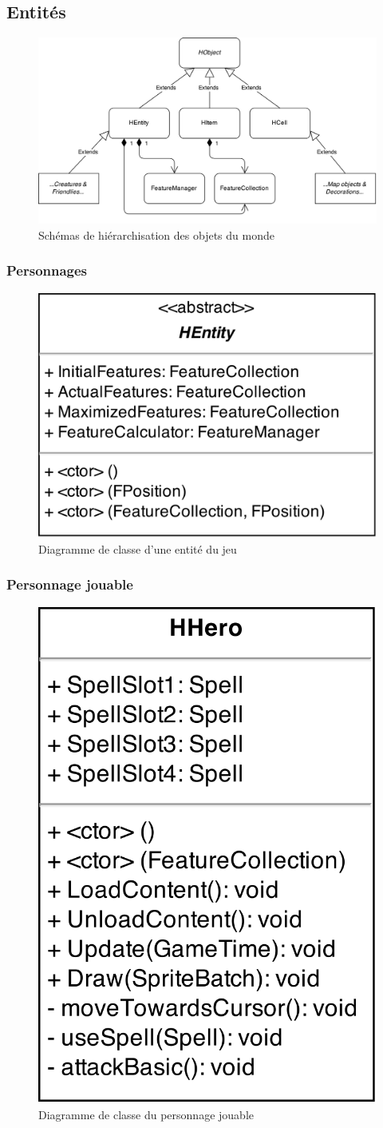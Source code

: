 \documentclass[11pt, a4paper, oneside]{report}
\begin{document}
\subsection{Entités}
\begin{figure}[H]
	\begin{center}
	\includegraphics[width=1\textwidth]{WorldObjects}
	\caption{Schémas de hiérarchisation des objets du monde}
	\label{fig:WorldObjects}
	\end{center}
\end{figure}
\subsubsection{Personnages}
\begin{figure}[H]
	\begin{center}
	\includegraphics[width=.35\textwidth]{HEntity}
	\caption{Diagramme de classe d'une entité du jeu}
	\label{fig:HEntity}
	\end{center}
\end{figure}
\subsubsection{Personnage jouable}
\begin{figure}[H]
	\begin{center}
	\includegraphics[width=.35\textwidth]{HHero}
	\caption{Diagramme de classe du personnage jouable}
	\label{fig:HHero}
	\end{center}
\end{figure}
\end{document}
